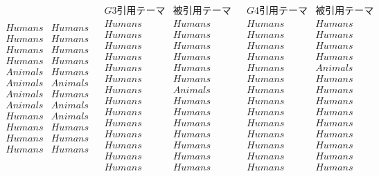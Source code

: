 \begin{table}[h]
\begin{center}
{\[\begin{array}{c|cccc}
\begin{array}{cc}
 {Humans} & {Humans} \\
 {Humans} & {Humans} \\
 {Humans} & {Humans} \\
 {Humans} & {Humans} \\
 {Animals} & {Humans} \\
 {Animals} & {Animals} \\
 {Animals} & {Humans} \\
 {Animals} & {Animals} \\
 {Humans} & {Animals} \\
 {Humans} & {Humans} \\
 {Humans} & {Humans} \\
 {Humans} & {Humans} \\
\end{array}
 & 
\begin{array}{cc}
 {G3引用テーマ} & {被引用テーマ} \\
\hline
 {Humans} & {Humans} \\
 {Humans} & {Humans} \\
 {Humans} & {Humans} \\
 {Humans} & {Humans} \\
 {Humans} & {Humans} \\
 {Humans} & {Humans} \\
 {Humans} & {Animals} \\
 {Humans} & {Humans} \\
 {Humans} & {Humans} \\
 {Humans} & {Humans} \\
 {Humans} & {Humans} \\
 {Humans} & {Humans} \\
 {Humans} & {Humans} \\
 {Humans} & {Humans} \\
\end{array}
 & 
\begin{array}{cc}
 {G4引用テーマ} & {被引用テーマ} \\
\hline
 {Humans} & {Humans} \\
 {Humans} & {Humans} \\
 {Humans} & {Humans} \\
 {Humans} & {Humans} \\
 {Humans} & {Animals} \\
 {Humans} & {Humans} \\
 {Humans} & {Humans} \\
 {Humans} & {Humans} \\
 {Humans} & {Humans} \\
 {Humans} & {Humans} \\
 {Humans} & {Humans} \\
 {Humans} & {Humans} \\
 {Humans} & {Humans} \\
 {Humans} & {Humans} \\
\end{array}
 \\
\end{array}\]
}
\end{center}
\end{table}
